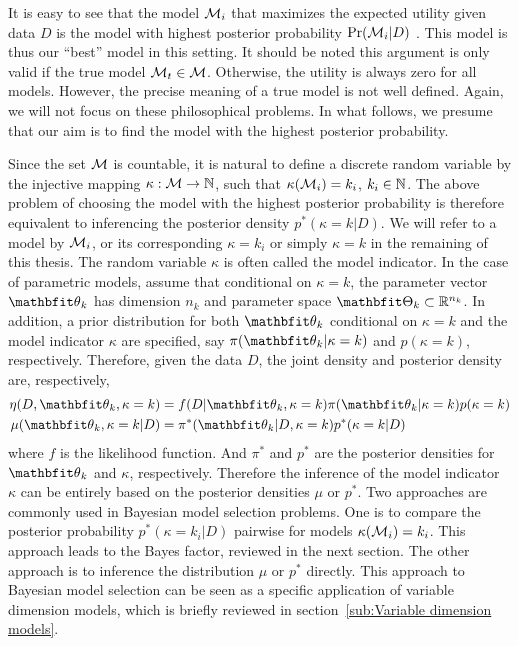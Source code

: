 \documentclass[10pt, hyper, bib, fontset=Lucida,
linespread=1.3, typearearatio=0.75]{marticle}
\begin{document}
It is easy to see that the model $\mathcal{M}_i$ that maximizes the expected utility
given data $D$ is the model with highest posterior probability
$\Pr(\mathcal{M}_i|D)$ \parencite[see][chap.~6]{Bernardo:1994vd}. This model is thus
our ``best'' model in this setting. It should be noted this argument is only
valid if the true model $\mathcal{M}_t \in \mathcal{M}$. Otherwise, the utility is always
zero for all models. However, the precise meaning of a true model is not well
defined. Again, we will not focus on these philosophical problems. In what
follows, we presume that our aim is to find the model with the highest
posterior probability.

Since the set $\mathcal{M}$ is countable, it is natural to define a discrete random
variable by the injective mapping $\kappa:\mathcal{M}\to\mathbb{N}$, such that
$\kappa(\mathcal{M}_i) = k_i$, $k_i \in \mathbb{N}$. The above problem of choosing the
model with the highest posterior probability is therefore equivalent to
inferencing the posterior density $p^*(\kappa = k|D)$. We will refer to a
model by $\mathcal{M}_i$, or its corresponding $\kappa = k_i$ or simply $\kappa = k$
in the remaining of this thesis. The random variable $\kappa$ is often called
the model indicator. In the case of parametric models, assume that conditional
on $\kappa = k$, the parameter vector $\bth_k$ has dimension $n_k$ and
parameter space $\bTh_k\subset\bbR^{n_k}$. In addition, a prior distribution
for both $\bth_k$ conditional on $\kappa = k$ and the model indicator $\kappa$
are specified, say $\pi(\bth_k|\kappa =k)$ and $p(\kappa = k)$, respectively.
Therefore, given the data $D$, the joint density and posterior density are,
respectively,
\begin{align}
  \eta(D,\bth_k,\kappa=k)
  &= f(D|\bth_k,\kappa=k)\pi(\bth_k|\kappa=k)p(\kappa=k)
  \label{eq:full joint}\\
  \mu(\bth_k,\kappa=k|D)
  &= \pi^*(\bth_k|D,\kappa=k)p^*(\kappa=k|D)
  \label{eq:full posterior}
\end{align}
where $f$ is the likelihood function. And $\pi^*$ and $p^*$ are the posterior
densities for $\bth_k$ and $\kappa$, respectively. Therefore the inference of
the model indicator $\kappa$ can be entirely based on the posterior densities
$\mu$ or $p^*$. Two approaches are commonly used in Bayesian model selection
problems. One is to compare the posterior probability $p^*(\kappa=k_i|D)$
pairwise for models $\kappa(\mathcal{M}_i) = k_i$. This approach leads to the Bayes
factor, reviewed in the next section. The other approach is to inference the
distribution $\mu$ or $p^*$ directly. This approach to Bayesian model
selection can be seen as a specific application of variable dimension models,
which is briefly reviewed in section~\ref{sub:Variable dimension models}.
\end{document}

